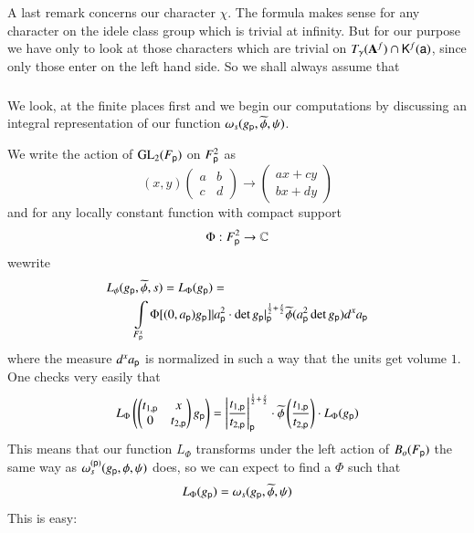 A last remark concerns our character $\chi$. The formula makes sense for any character on the idele class group which is trivial at infinity. But for our purpose we have only to look at those characters which are trivial on $T_{\gamma}(\mathbf{A}^{f})\cap \mathsf{K}^{f}(\mathsf{a})$, since only those enter on the left hand side. So we shall always assume that

\subsubsection{}\label{art2-sec3.1.4}
We look, at the finite places first and we begin our computations by discussing an integral representation of our function $\omega_{s}(g_{\mathsf{p}},\widetilde{\phi},\psi)$.

We write the action of $\mathrm{GL}_{2}(F_{\mathsf{p}})$ on $F^{2}_{\mathsf{p}}$ as
$$
(x,y)\left(
\begin{matrix}
a & b\\
c & d
\end{matrix}
\right)
\to \left(
\begin{matrix}
ax+cy\\
bx+dy
\end{matrix}
\right)
$$
and for any locally constant function with compact support
$$
\Phi:F^{2}_{\mathsf{p}}\to \mathbb{C}
$$
we\pageoriginale write
\begin{align*}
& L_{\phi}(g_{\mathsf{p}},\widetilde{\phi},s)=L_{\Phi}(g_{\mathsf{p}})=\\
&\qquad \int\limits_{F^{x}_{\mathsf{p}}}\Phi[(0,a_{\mathsf{p}})g_{\mathsf{p}}]|a^{2}_{\mathsf{p}}\cdot \det g_{\mathsf{p}}|^{\frac{1}{2}+\frac{s}{2}}_{\mathsf{p}}\widetilde{\phi}(a^{2}_{\mathsf{p}}\det g_{\mathsf{p}})d^{x}a_{\mathsf{p}}
\end{align*}
where the measure $d^{x}a_{\mathsf{p}}$ is normalized in such a way that the units get volume $1$. One checks very easily that
$$
L_{\Phi}\left(\left(
\begin{matrix}
t_{1,\mathsf{p}} & x\\
0 & t_{2,\mathsf{p}}
\end{matrix}
\right)g_{\mathsf{p}}\right)=
\left|
\frac{t_{1,\mathsf{p}}}{t_{2,\mathsf{p}}}\right|^{\frac{1}{2}+\frac{s}{2}}_{\mathsf{p}}\cdot \widetilde{\phi}\left(\dfrac{t_{1,\mathsf{p}}}{t_{2,\mathsf{p}}}\right)\cdot L_{\Phi}(g_{\mathsf{p}})
$$
This means that our function $L_{\Phi}$ transforms under the left action of $B_{o}(F_{\mathsf{p}})$ the same way as $\omega^{(\mathsf{p})}_{s}(g_{\mathsf{p}},\phi,\psi)$ does, so we can expect to find a $\Phi$ such that
$$
L_{\Phi}(g_{\mathsf{p}})=\omega_{s}(g_{\mathsf{p}},\widetilde{\phi},\psi)
$$
This is easy:

